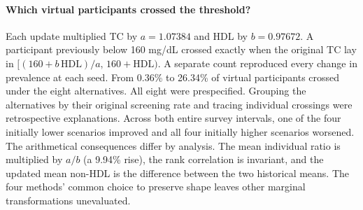 \paragraph{Which virtual participants crossed the threshold?}
Each update multiplied TC by $a=1.07384$ and HDL by $b=0.97672$. A participant previously below 160 mg/dL crossed exactly when the original TC lay in $[(160+b\,\mathrm{HDL})/a,\,160+\mathrm{HDL})$. A separate count reproduced every change in prevalence at each seed. From 0.36\% to 26.34\% of virtual participants crossed under the eight alternatives. All eight were prespecified. Grouping the alternatives by their original screening rate and tracing individual crossings were retrospective explanations. Across both entire survey intervals, one of the four initially lower scenarios improved and all four initially higher scenarios worsened. The arithmetical consequences differ by analysis. The mean individual ratio is multiplied by $a/b$ (a 9.94\% rise), the rank correlation is invariant, and the updated mean non-HDL is the difference between the two historical means. The four methods' common choice to preserve shape leaves other marginal transformations unevaluated.
